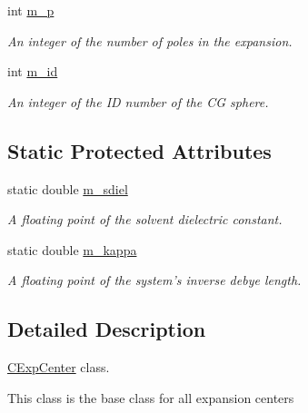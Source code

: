 \begin{DoxyCompactItemize}
\item 
int \hyperlink{classCExpCenter_a2a3e3bc7c527c49e9ea4149dd33f4dba}{m\-\_\-p}
\begin{DoxyCompactList}\small\item\em An integer of the number of poles in the expansion. \end{DoxyCompactList}\item 
int \hyperlink{classCExpCenter_a7dcda3540f2ff0b3bfd668889ef1e95a}{m\-\_\-id}
\begin{DoxyCompactList}\small\item\em An integer of the I\-D number of the C\-G sphere. \end{DoxyCompactList}\end{DoxyCompactItemize}
\subsection*{Static Protected Attributes}
\begin{DoxyCompactItemize}
\item 
static double \hyperlink{classCExpCenter_a027b6ddd209098aa7f6c71f7b43367b3}{m\-\_\-sdiel}
\begin{DoxyCompactList}\small\item\em A floating point of the solvent dielectric constant. \end{DoxyCompactList}\item 
static double \hyperlink{classCExpCenter_aca58b7a93949d83d4b7883b54d0473e5}{m\-\_\-kappa}
\begin{DoxyCompactList}\small\item\em A floating point of the system's inverse debye length. \end{DoxyCompactList}\end{DoxyCompactItemize}


\subsection{Detailed Description}
\hyperlink{classCExpCenter}{C\-Exp\-Center} class. 

This class is the base class for all expansion centers 

